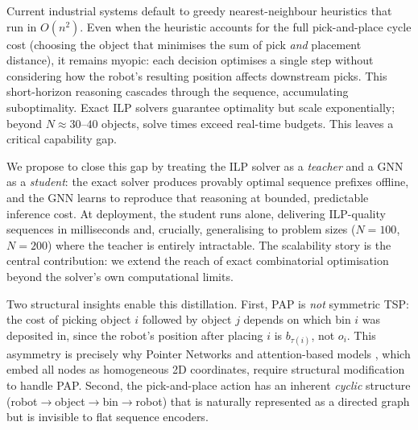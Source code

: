 \documentclass[conference]{IEEEtran}
\begin{document}
Current industrial systems default to greedy nearest-neighbour heuristics that run in $O(n^2)$. Even when the heuristic accounts for the full pick-and-place cycle cost (choosing the object that minimises the sum of pick \emph{and} placement distance), it remains myopic: each decision optimises a single step without considering how the robot's resulting position affects downstream picks. This short-horizon reasoning cascades through the sequence, accumulating suboptimality. Exact ILP solvers guarantee optimality but scale exponentially; beyond $N \approx 30$--$40$ objects, solve times exceed real-time budgets. This leaves a critical capability gap.

We propose to close this gap by treating the ILP solver as a \emph{teacher} and a GNN as a \emph{student}: the exact solver produces provably optimal sequence prefixes offline, and the GNN learns to reproduce that reasoning at bounded, predictable inference cost. At deployment, the student runs alone, delivering ILP-quality sequences in milliseconds and, crucially, generalising to problem sizes ($N{=}100$, $N{=}200$) where the teacher is entirely intractable. The scalability story is the central contribution: we extend the reach of exact combinatorial optimisation beyond the solver's own computational limits.

Two structural insights enable this distillation. First, PAP is \emph{not} symmetric TSP: the cost of picking object $i$ followed by object $j$ depends on which bin $i$ was deposited in, since the robot's position after placing $i$ is $b_{\tau(i)}$, not $o_i$. This asymmetry is precisely why Pointer Networks \cite{vinyals2015pointer} and attention-based models \cite{kool2019attention}, which embed all nodes as homogeneous 2D coordinates, require structural modification to handle PAP. Second, the pick-and-place action has an inherent \emph{cyclic} structure (robot$\to$object$\to$bin$\to$robot) that is naturally represented as a directed graph but is invisible to flat sequence encoders.
\end{document}
